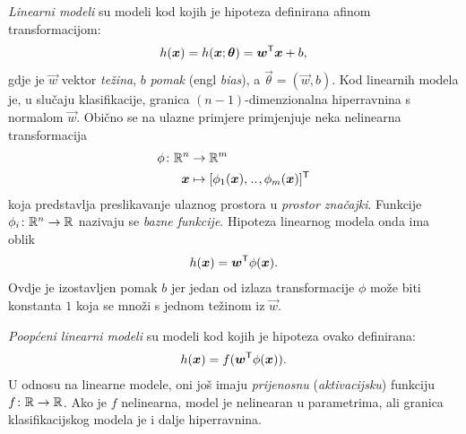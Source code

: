 \documentclass[utf8, diplomski, lmodern]{fer}
\begin{document}
\emph{Linearni modeli} su modeli kod kojih je hipoteza definirana afinom transformacijom:
\begin{align}
h(\vec x) = h(\vec x;\vec\theta) = \vec w^\tp\vec x + b \text{,}
\end{align}
gdje je $\vec w$ vektor \emph{težina}, $b$ \emph{pomak} (engl \textit{bias}), a $\vec\theta=(\vec w, b)$. Kod linearnih modela je, u slučaju klasifikacije, granica $(n-1)$-dimenzionalna hiperravnina s normalom $\vec w$. Obično se na ulazne primjere primjenjuje neka nelinearna transformacija
\begin{align*}
\phi \colon \R^n &\to \R^m \\
\vec x &\mapsto \sbr{\phi_1(\vec x),\bidot,\phi_m(\vec x)}^\tp
\end{align*}
koja predstavlja preslikavanje ulaznog prostora u \emph{prostor značajki}. Funkcije $\phi_i \colon \mathbb{R}^n \to \mathbb{R}$ nazivaju se \emph{bazne funkcije}. Hipoteza linearnog modela onda ima oblik
\begin{align}
h(\vec x) = \vec w^\tp\phi(\vec x) \text{.}
\end{align}
Ovdje je izostavljen pomak $b$ jer jedan od izlaza transformacije $\phi$ može biti konstanta $1$ koja se množi s jednom težinom iz $\vec w$. 

\emph{Poopćeni linearni modeli} su modeli kod kojih je hipoteza ovako definirana:
\begin{align} \label{eq:poopceni-linearni-model}
h(\vec x) = f(\vec w^\tp\phi(\vec x)) \text{.}
\end{align}
U odnosu na linearne modele, oni još imaju \emph{prijenosnu} (\emph{aktivacijsku}) funkciju $f \colon \mathbb{R} \to \mathbb{R}$. Ako je $f$ nelinearna, model je nelinearan u parametrima, ali granica klasifikacijskog modela je i dalje hiperravnina.
\end{document}
